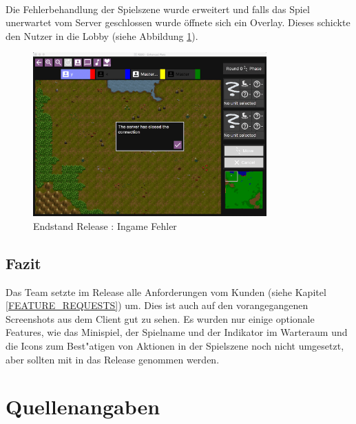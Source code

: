 \documentclass[12pt, titlepage]{scrartcl}
\newcommand{\RN}[1]{%
	\textup{\uppercase\expandafter{\romannumeral#1}}%
}
\begin{document}
					\ \\ Die Fehlerbehandlung der Spielszene wurde erweitert und falls das Spiel unerwartet vom Server geschlossen wurde \"offnete sich ein Overlay. Dieses schickte den Nutzer in die Lobby (siehe Abbildung \ref{End_Failure}).
					\begin{figure}[H] 
						\centering
						\includegraphics[width=0.8\textwidth]{images/endOfRelease/Failure.png}
						\caption{Endstand Release \RN{3}: Ingame Fehler}
						\label{End_Failure}
					\end{figure}
		\subsection{Fazit}
			Das Team setzte im Release \RN{3} alle Anforderungen vom Kunden (siehe Kapitel \ref{FEATURE_REQUESTS}) um. Dies ist auch auf den vorangegangenen Screenshots aus dem Client gut zu sehen. Es wurden nur einige optionale Features, wie das Minispiel, der Spielname und der Indikator im Warteraum und die Icons zum Best"atigen von Aktionen in der Spielszene noch nicht umgesetzt, aber sollten mit in das Release \RN{4} genommen werden.
	\newpage
	\section{Quellenangaben}
		\listoffigures
		\listoftables
\end{document}
